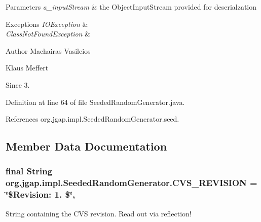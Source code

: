 \begin{DoxyParams}{Parameters}
{\em a\-\_\-input\-Stream} & the Object\-Input\-Stream provided for deserialzation\\
\hline
\end{DoxyParams}

\begin{DoxyExceptions}{Exceptions}
{\em I\-O\-Exception} & \\
\hline
{\em Class\-Not\-Found\-Exception} & \\
\hline
\end{DoxyExceptions}
\begin{DoxyAuthor}{Author}
Machairas Vasileios 

Klaus Meffert 
\end{DoxyAuthor}
\begin{DoxySince}{Since}
3. 
\end{DoxySince}


Definition at line 64 of file Seeded\-Random\-Generator.\-java.



References org.\-jgap.\-impl.\-Seeded\-Random\-Generator.\-seed.



\subsection{Member Data Documentation}
\hypertarget{classorg_1_1jgap_1_1impl_1_1_seeded_random_generator_a7af667512d1d22347bada77695a5ee55}{
\subsubsection[{C\-V\-S\-\_\-\-R\-E\-V\-I\-S\-I\-O\-N}]{\setlength{\rightskip}{0pt plus 5cm}final String org.\-jgap.\-impl.\-Seeded\-Random\-Generator.\-C\-V\-S\-\_\-\-R\-E\-V\-I\-S\-I\-O\-N = \char`\"{}\$Revision\-: 1. \$\char`\"{}\hspace{0.3cm}{\ttfamily [static]}, {\ttfamily [private]}}}\label{classorg_1_1jgap_1_1impl_1_1_seeded_random_generator_a7af667512d1d22347bada77695a5ee55}
String containing the C\-V\-S revision. Read out via reflection! 

